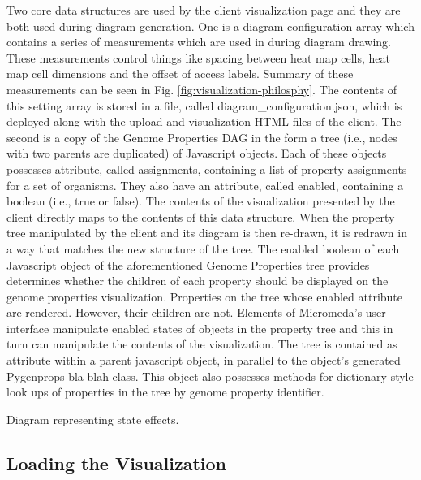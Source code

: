 Two core data structures are used by the client visualization page and they are both used during diagram generation. One is a diagram configuration array which contains a series of measurements which are used in during diagram drawing. These measurements control things like spacing between heat map cells, heat map cell dimensions and the offset of access labels. Summary of these measurements can be seen in Fig. \ref{fig:visualization-philosphy}. The contents of this setting array is stored in a file, called diagram_configuration.json, which is deployed along with the upload and visualization HTML files of the client. The second is a copy of the Genome Properties DAG in the form a tree (i.e., nodes with two parents are duplicated) of Javascript objects. Each of these objects possesses attribute, called assignments, containing a list of property assignments for a set of organisms. They also have an attribute, called enabled, containing a boolean (i.e., true or false). The contents of the visualization presented by the client directly maps to the contents of this data structure. When the property tree manipulated by the client and its diagram is then re-drawn, it is redrawn in a way that matches the new structure of the tree. The enabled boolean of each Javascript object of the aforementioned Genome Properties tree provides determines whether the children of each property should be displayed on the genome properties visualization. Properties on the tree whose enabled attribute are rendered. However, their children are not. Elements of Micromeda's user interface manipulate enabled states of objects in the property tree and this in turn can manipulate the contents of the visualization. The tree is contained as attribute within a parent javascript object, in parallel to the object's generated Pygenprops bla blah class. This object also possesses methods for dictionary style look ups of properties in the tree by genome property identifier.

Diagram representing state effects.

\subsection{Loading the Visualization}

